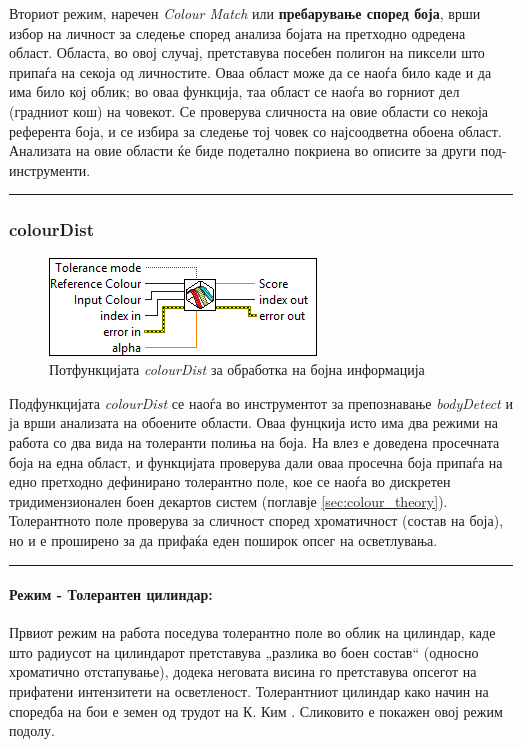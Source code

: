 \documentclass[12pt]{article}
\begin{document}
      Вториот режим, наречен \textit{Colour Match} или \textbf{пребарување според боја}, врши избор на личност за следење според анализа бојата на претходно одредена област. Областа, во овој случај, претставува посебен полигон на пиксели што припаѓа на секоја од личностите. Оваа област може да се наоѓа било каде и да има било кој облик; во оваа функција, таа област се наоѓа во горниот дел (градниот кош) на човекот. Се проверува сличноста на овие области со некоја референта боја, и се избира за следење тој човек со најсоодветна обоена област. Анализата на овие области ќе биде подетално покриена во описите за други под-инструменти.
      \textcolor[RGB]{150,150,150}{\rule{\linewidth}{1.6pt}}

    \subsubsection{colourDist}
	    \begin{figure}[H]
	      \includegraphics[width=0.55\linewidth]{./images/colourDist_border.png}
		    \caption{Потфункцијата \textit{colourDist} за обработка на бојна информација}
	      \label{fig:colourDist.png}
	      \raggedright
	      \end{figure}
      Подфункцијата \textit{colourDist} се наоѓа во инструментот за препознавање \textit{bodyDetect} и ја врши анализата на обоените области. Оваа фунцкија исто има два режими на работа со два вида на толеранти полиња на боја. На влез е доведена просечната боја на една област, и функцијата проверува дали оваа просечна боја припаѓа на едно претходно дефинирано толерантно поле, кое се наоѓа во дискретен тридимензионален боен декартов систем (поглавје \ref{sec:colour_theory}). Толерантното поле проверува за сличност според хроматичност (состав на боја), но и е проширено за да прифаќа еден поширок опсег на осветлувања.
      \textcolor[RGB]{150,150,150}{\rule{\linewidth}{1.6pt}}

      \paragraph{Режим - Толерантен цилиндар:\\}
        Првиот режим на работа поседува толерантно поле во облик на цилиндар, каде што радиусот на цилиндарот претставува „разлика во боен состав“ (односно хроматично отстапување), додека неговата висина го претставува опсегот на прифатени интензитети на осветленост. Толерантниот цилиндар како начин на споредба на бои е земен од трудот на К. Ким \cite{kim}. Сликовито е покажен овој режим подолу.
\end{document}
